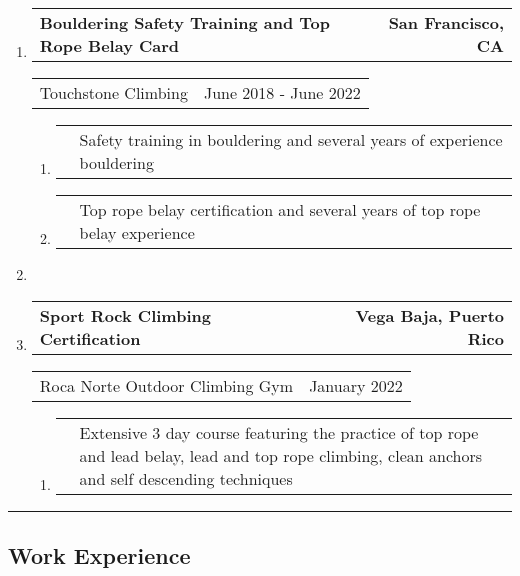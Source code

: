 \documentclass[letterpaper]{article}
\makeatletter
\newcommand*{\tabulardef}[3]{\begin{tabular}[t]{@{}lp{\dimexpr\linewidth-#1}@{}}
    #2&#3
\end{tabular}}
\newcommand{\headerrow}[2]
{\begin{tabular*}{\linewidth}{l@{\extracolsep{\fill}}r}
	#1 &
	#2 \\
\end{tabular*}}
\makeatother
\begin{document}
\begin{enumerate}[label=]
\parskip=-0.25em
    \item
        \headerrow
        { \textbf{Bouldering Safety Training and Top Rope Belay Card }}
        { \textbf {San Francisco, CA} }
        \headerrow
        {Touchstone Climbing}
        {June 2018 - June 2022}
        \begin{enumerate}[label= *]
            \parskip=-0.1em
        \item\tabulardef{5cm}{}{Safety training in bouldering and several years of experience bouldering}
        \item\tabulardef{5cm}{}{Top rope belay certification and several years of top rope belay experience}
        \end{enumerate}

    \item

    \item
        \headerrow
        { \textbf{Sport Rock Climbing Certification }}
        { \textbf {Vega Baja, Puerto Rico} }
        \headerrow
        {Roca Norte Outdoor Climbing Gym}
        {January 2022}
        \begin{enumerate}[label= *]
            \parskip=-0.1em
            \item\tabulardef{5cm}{}{
                    Extensive 3 day course featuring the practice of top rope and
                    lead belay, lead and top rope climbing, clean anchors and self
                    descending techniques}
        \end{enumerate}
\end{enumerate}        

\hrule
\vspace{-0.6em}
\subsection*{Work Experience}
\end{document}
